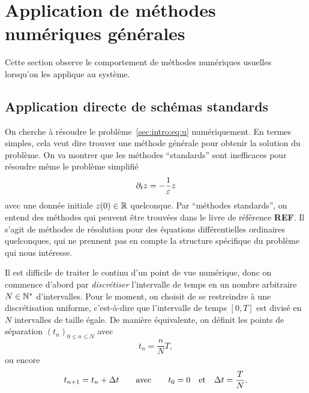 \section*{Application de méthodes numériques générales}

Cette section observe le comportement de méthodes numériques usuelles
lorsqu'on les applique au système.

\subsection*{Application directe de schémas standards}


On cherche à résoudre le problème~\eqref{sec:intro:eq:u} numériquement.
En termes simples, cela veut dire trouver une méthode générale pour
obtenir la solution du problème. On va montrer que les méthodes
\enquote{standards} sont inefficaces pour résoudre même le problème
simplifié 
\begin{equation} \label{sec:intro:eq:pb_zlin}
    \partial_t z = -\frac{1}{\varepsilon}z
\end{equation}
avec une donnée initiale $z(0) \in \mathbb{R}$ quelconque. Par
\enquote{méthodes standards}, on entend des méthodes qui peuvent être
trouvées dans le livre de référence \textbf{REF}.
Il s'agit de méthodes de résolution pour des équations différentielles
ordinaires quelconques, qui ne prennent pas en compte la structure
spécifique du problème qui nous intéresse. 


Il est difficile de traiter le continu d'un point de vue numérique, donc
on commence d'abord par \textit{discrétiser} l'intervalle de temps en un
nombre arbitraire $N \in \mathbb{N}^*$ d'intervalles.
%
%
\noindent%
Pour le moment, on choisit de se restreindre à une discrétisation
uniforme, c'est-à-dire que l'intervalle de temps $[0,T]$ est divisé en
$N$ intervalles de taille égale. De manière équivalente, on définit les
points de séparation $(t_n)_{0 \leq n \leq N}$ avec 
\begin{equation*}
    t_n = \frac{n}{N} T ,
\end{equation*}
ou encore 
\begin{equation*}
    t_{n+1} = t_n + \Delta t
    \qquad\text{avec}\qquad
    t_0 = 0 \quad\text{et}\quad \Delta t = \frac{T}{N} .
\end{equation*}

